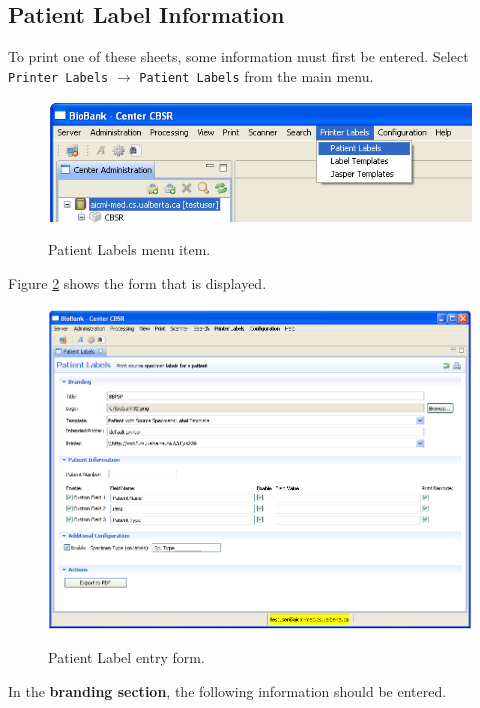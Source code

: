 \subsection{Patient Label Information}

To print one of these sheets, some information must first be entered. Select
\texttt{Printer Labels} $\to$ \texttt{Patient Labels} from the main menu.

\begin{figure}[H]
  \centering
  \scalebox{0.35}
	   { \includegraphics*{screenshots/printer_labels/02_patient_labels_menu_item} }
	   \caption{Patient Labels menu item.}
	   \label{fig:patient_labels_menu_item}
\end{figure}

Figure \ref{fig:patient_label_form} shows the form that is displayed.

\begin{figure}[H]
  \centering
  \scalebox{0.45}
	   { \includegraphics*{screenshots/printer_labels/03_patient_label_form} }
	   \caption{Patient Label entry form.}
	   \label{fig:patient_label_form}
\end{figure}

In the \textbf{branding section}, the following information should be entered.

